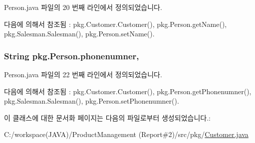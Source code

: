 Person.\+java 파일의 20 번째 라인에서 정의되었습니다.



다음에 의해서 참조됨 \+:  pkg.\+Customer.\+Customer(), pkg.\+Person.\+get\+Name(), pkg.\+Salesman.\+Salesman(), pkg.\+Person.\+set\+Name().

\subsubsection[{\texorpdfstring{phonenumner}{phonenumner}}]{\setlength{\rightskip}{0pt plus 5cm}String pkg.\+Person.\+phonenumner\hspace{0.3cm}{\ttfamily [protected]}, {\ttfamily [inherited]}}\hypertarget{classpkg_1_1_person_aa7a67349f91a08a8cc45067354653c1d}{}\label{classpkg_1_1_person_aa7a67349f91a08a8cc45067354653c1d}


Person.\+java 파일의 22 번째 라인에서 정의되었습니다.



다음에 의해서 참조됨 \+:  pkg.\+Customer.\+Customer(), pkg.\+Person.\+get\+Phonenumner(), pkg.\+Salesman.\+Salesman(), pkg.\+Person.\+set\+Phonenumner().



이 클래스에 대한 문서화 페이지는 다음의 파일로부터 생성되었습니다.\+:\begin{DoxyCompactItemize}
\item 
C\+:/workspace(\+J\+A\+V\+A)/\+Product\+Management (\+Report\#2)/src/pkg/\hyperlink{_customer_8java}{Customer.\+java}\end{DoxyCompactItemize}
